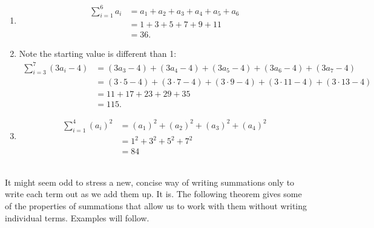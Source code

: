 {\begin{enumerate}
		\item		\noindent\vskip-45pt%
						\begin{align*}
						\sum_{i=1}^6 a_i &= a_1+a_2+a_3+a_4+a_5+a_6\\
														&=	1+3+5+7+9+11 \\
														&=	36.
					\end{align*}
		\item	Note the starting value is different than 1:
					\begin{align*}
					\sum_{i=3}^7 (3a_i-4) &= (3a_3-4)+(3a_4-4)+(3a_5-4)+(3a_6-4)+(3a_7-4) \\
&=(3\cdot5-4)+(3\cdot7-4)+(3\cdot9-4)+(3\cdot11-4)+(3\cdot13-4)\\
														&= 11+17+23+29+35 \\
														&= 115.
					\end{align*}
		\item		\noindent\vskip-45pt%
						\begin{align*}
						\sum_{i=1}^4 (a_i)^2 &=	(a_1)^2+(a_2)^2+(a_3)^2+(a_4)^2\\
																&=	1^2+3^2+5^2+7^2 \\
																&=	84
						\end{align*}
\end{enumerate}	
\baselineskip											
}\\

It might seem odd to stress a new, concise way of writing summations only to write each term out as we add them up. It is. The following theorem gives some of the properties of summations that allow us to work with them without writing individual terms. Examples will follow.

